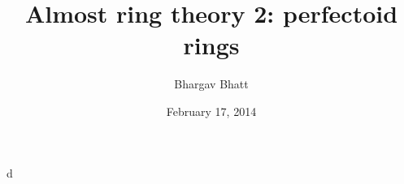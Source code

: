 \documentclass{article}
\title{Almost ring theory 2: perfectoid rings}
\author{Bhargav Bhatt}
\date{February 17, 2014}
\begin{document}
\maketitle





d
\end{document}
